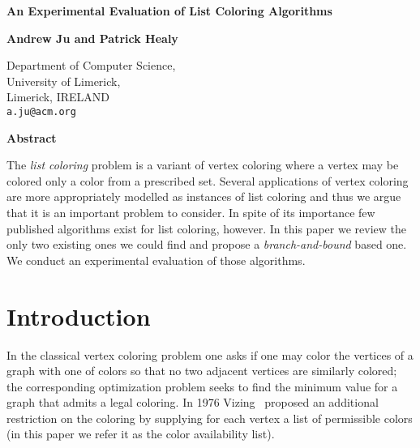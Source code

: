 \documentclass[10pt]{article}
\begin{document}
\newcommand{\NP}{N\!P}
\newcommand{\Vh}{V_h}
\newcommand{\Eh}{E_h}
\newcommand{\Vl}{V_l}
\newcommand{\El}{E_l}
\newcommand{\Vs}{V_s}
\newcommand{\Vt}{V_t}
\newcommand{\Vi}{V_i}
\newcommand{\card}[1]{|#1|}
\newcommand{\outd}[1]{d^+(#1)}
\newcommand{\ind}[1]{d^-(#1)}
\renewcommand{\th}{\mbox{}}
\newtheorem{mydef}{Definition}
\pagestyle{empty}
\vspace*{10mm}

\begin{center}
 {\Large \bf An Experimental Evaluation of List Coloring Algorithms}

\vspace{7mm}

 {\large \bf Andrew Ju and Patrick Healy\\}

\vspace{1mm}
 {\large Department of Computer Science,\\
  University of Limerick, \\Limerick, IRELAND\\
  \texttt{a.ju@acm.org}\\}
\end{center}

\vspace{.1cm}
\noindent
  \begin{center}
  \textbf{Abstract}
  \end{center}
  
  The \emph{list coloring} problem is a variant of vertex coloring where
  a vertex may be colored only a color from a prescribed set.  Several
  applications of vertex coloring are more appropriately modelled as
  instances of list coloring and thus we argue that it is an important
  problem to consider.  In spite of its importance few published
  algorithms exist for list coloring, however.  In this paper we review
  the only two existing ones we could find and propose a \textit{branch-and-bound} 
  based one.  We conduct an experimental evaluation of those algorithms.

\section{Introduction}\label{sec:intro}

In the classical vertex coloring problem one asks if one may color the
vertices of a graph  with one of  colors so that no two adjacent
vertices are similarly colored; the corresponding optimization problem
seeks to find the minimum value  for a graph that admits a legal 
coloring.  In 1976 Vizing~\cite{vizing-76:list-col} proposed an
additional restriction on the coloring by supplying for each vertex a
list of permissible colors (in this paper we refer it as the color availability list).
\end{document}
